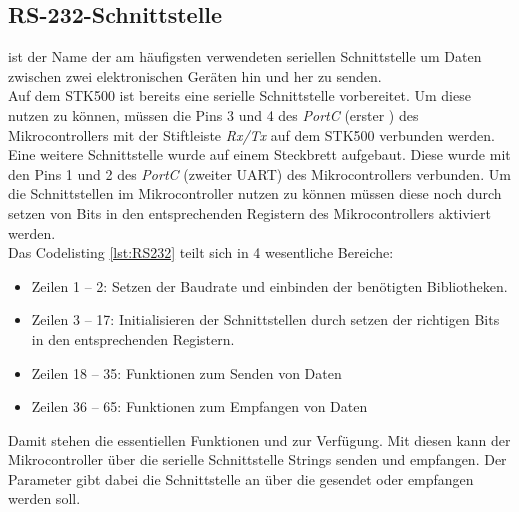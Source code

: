 \subsection{RS-232-Schnittstelle}
\label{sec:RS232}	
 ist der Name der am häufigsten verwendeten seriellen Schnittstelle um Daten zwischen zwei elektronischen Geräten hin und her zu senden. \cite{uC:RS232}\\
Auf dem STK500 ist bereits eine serielle Schnittstelle vorbereitet. Um diese nutzen zu können, müssen die Pins 3 und 4 des \emph{PortC} (erster ) des Mikrocontrollers mit der Stiftleiste \emph{Rx/Tx} auf dem STK500 verbunden werden. Eine weitere Schnittstelle wurde auf einem Steckbrett aufgebaut. Diese wurde mit den Pins 1 und 2 des \emph{PortC} (zweiter UART) des Mikrocontrollers verbunden. Um die Schnittstellen im Mikrocontroller nutzen zu können müssen diese noch durch setzen von Bits in den entsprechenden Registern des Mikrocontrollers aktiviert werden.\\
Das Codelisting \ref{lst:RS232} teilt sich in 4 wesentliche Bereiche: \\
\begin{itemize}
\item Zeilen 1 -- 2: Setzen der Baudrate und einbinden der benötigten Bibliotheken.
\item Zeilen 3 -- 17: Initialisieren der Schnittstellen durch setzen der richtigen Bits in den entsprechenden Registern.
\item Zeilen 18 -- 35: Funktionen zum Senden von Daten
\item Zeilen 36 -- 65: Funktionen zum Empfangen von Daten
\end{itemize}
\lstset{language=C, basicstyle=\footnotesize, showstringspaces=false, tabsize=8}

Damit stehen die essentiellen Funktionen  und \linebreak{} zur Verfügung. Mit diesen kann der Mikrocontroller über die serielle Schnittstelle Strings senden und empfangen. Der Parameter  gibt dabei die Schnittstelle an über die gesendet oder empfangen werden soll.

